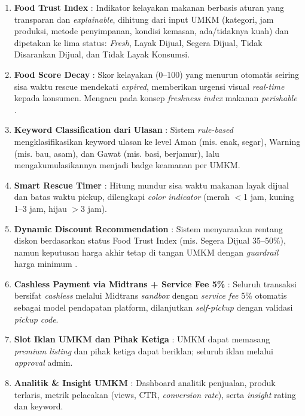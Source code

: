 \begin{enumerate}[leftmargin=*]
    \item \textbf{Food Trust Index} : Indikator kelayakan makanan berbasis aturan yang transparan dan
    \textit{explainable}, dihitung dari input UMKM (kategori, jam produksi, metode penyimpanan, kondisi
    kemasan, ada/tidaknya kuah) dan dipetakan ke lima status: \textit{Fresh}, Layak Dijual, Segera
    Dijual, Tidak Disarankan Dijual, dan Tidak Layak Konsumsi.

    \item \textbf{Food Score Decay} : Skor kelayakan (0--100) yang menurun otomatis seiring sisa waktu
    rescue mendekati \textit{expired}, memberikan urgensi visual \textit{real-time} kepada konsumen.
    Mengacu pada konsep \textit{freshness index} makanan \textit{perishable} \cite{iotshelflife2025}.

    \item \textbf{Keyword Classification dari Ulasan} : Sistem \textit{rule-based} mengklasifikasikan
    keyword ulasan ke level Aman (mis. enak, segar), Warning (mis. bau, asam), dan Gawat (mis. basi,
    berjamur), lalu mengakumulasikannya menjadi badge keamanan per UMKM.

    \item \textbf{Smart Rescue Timer} : Hitung mundur sisa waktu makanan layak dijual dan batas waktu
    pickup, dilengkapi \textit{color indicator} (merah $<$1 jam, kuning 1--3 jam, hijau $>$3 jam).

    \item \textbf{Dynamic Discount Recommendation} : Sistem menyarankan rentang diskon berdasarkan status
    Food Trust Index (mis. Segera Dijual 35--50\%), namun keputusan harga akhir tetap di tangan UMKM
    dengan \textit{guardrail} harga minimum \cite{qlearning2026pricing}.

    \item \textbf{Cashless Payment via Midtrans + Service Fee 5\%} : Seluruh transaksi bersifat
    \textit{cashless} melalui Midtrans \textit{sandbox} dengan \textit{service fee} 5\% otomatis sebagai
    model pendapatan platform, dilanjutkan \textit{self-pickup} dengan validasi \textit{pickup code}.

    \item \textbf{Slot Iklan UMKM dan Pihak Ketiga} : UMKM dapat memasang \textit{premium listing} dan
    pihak ketiga dapat beriklan; seluruh iklan melalui \textit{approval} admin.

    \item \textbf{Analitik \& Insight UMKM} : Dashboard analitik penjualan, produk terlaris, metrik
    pelacakan (views, CTR, \textit{conversion rate}), serta \textit{insight} rating dan keyword.


\end{enumerate}
